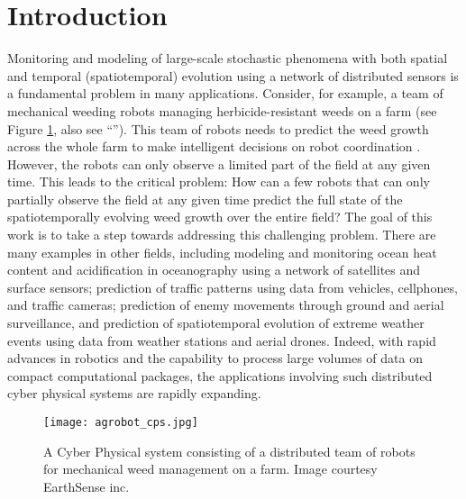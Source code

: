 \section{Introduction} \label{sec:intro}
Monitoring and modeling of large-scale stochastic phenomena with both spatial and temporal (spatiotemporal) evolution using a network of distributed sensors is a fundamental problem in many applications. Consider, for example, a team of mechanical weeding robots managing herbicide-resistant weeds on a farm (see Figure \ref{fig:cps}, also see ``''). This team of robots needs to predict the weed growth across the whole farm  to make intelligent decisions on robot coordination \cite{McAllistar18IROS}. However, the robots can only observe a limited part of the field at any given time. This leads to the critical problem: How can a few robots that can only partially observe the field at any given time predict the full state of the spatiotemporally evolving weed growth over the entire field? The goal of this work is to take a step towards addressing this challenging problem. There are many examples in other fields, including modeling and monitoring ocean heat content and acidification in oceanography \cite{barnett2001detection} using a network of satellites and surface sensors; prediction of traffic patterns using data from vehicles, cellphones, and traffic cameras; prediction of enemy movements through ground and aerial surveillance, and prediction of spatiotemporal evolution of extreme weather events \cite{heaton2011spatio} using data from weather stations  and aerial drones. Indeed, with rapid advances in robotics and the capability to process large volumes of data on compact computational packages, the applications involving such distributed cyber physical systems are rapidly expanding. %
 
\begin{figure}[h] %
	\centering
	\texttt{[image: agrobot\_cps.jpg]}
		\caption{A Cyber Physical system consisting of a distributed team of robots for mechanical weed management on a farm. Image courtesy EarthSense inc.}
	\label{fig:cps}
\end{figure}

